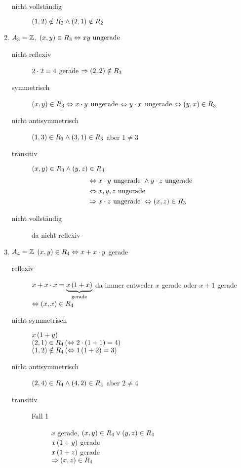 \begin{enumerate}[label=\alph*)]
\begin{description}
	\item[nicht vollständig] $\left(1, 2\right) \notin R_2 \wedge \left(2, 1\right) \notin R_2$
	\end{description}

\item $A_3 = \mathbb{Z}$, $\left(x, y\right) \in R_3 \Leftrightarrow xy \text{ ungerade}$
	\begin{description}
	\item[nicht reflexiv] $2 \cdot 2 = 4$ gerade $\Rightarrow \left(2,2\right) \notin R_3$
	\item[symmetrisch] $\left(x, y\right) \in R_3 \Leftrightarrow x \cdot y$ ungerade $\Leftrightarrow y \cdot x$ ungerade $\Leftrightarrow \left(y, x\right) \in R_3$
	\item[nicht antisymmetrisch] $\left(1, 3\right) \in R_3 \wedge \left(3, 1\right) \in R_3$ aber $1 \neq 3$
	\item[transitiv] $\left(x, y\right) \in R_3 \wedge \left(y, z\right) \in R_3$
		\begin{align*}
		&\Leftrightarrow x \cdot y \text{ ungerade } \wedge y \cdot z \text{ ungerade}\\
		&\Leftrightarrow x, y, z \text{ ungerade}\\
		&\Rightarrow x \cdot z \text{ ungerade } \Leftrightarrow \left(x, z\right) \in R_3
		\end{align*}

	\item[nicht vollständig] da nicht reflexiv
	\end{description}

\item $A_4 = \mathbb{Z}$ $\left(x, y\right) \in R_4 \Leftrightarrow x + x \cdot y$ gerade
	\begin{description}
	\item[reflexiv] $x + x \cdot x = \underbrace{x \left(1 + x\right)}_{\text{gerade}}$ da immer entweder $x$ gerade oder $x + 1$ gerade $\Leftrightarrow \left(x, x\right) \in R_4$
	\item[nicht symmetrisch] $x \left(1 + y\right)$\\
		$\left(2, 1\right) \in R_4 \left(\Leftrightarrow 2 \cdot \left(1 + 1\right) = 4\right)$\\
		$\left(1, 2\right) \notin R_4 \left(\Leftrightarrow 1 \left(1 + 2\right) = 3\right)$

	\item[nicht antisymmetrisch] $\left(2, 4\right) \in R_4 \wedge \left(4, 2\right) \in R_4$ aber $2 \neq 4$
	\item[transitiv]
		\begin{description}
		\item[Fall 1] $x$ gerade, $\left(x, y\right) \in R_4 \vee \left(y, z\right) \in R_4$\\
			$x \left(1 + y\right)$ gerade\\
			$x \left(1 + z\right)$ gerade\\
			$\Rightarrow \left(x, z\right) \in R_4$


\end{description}
\end{description}
\end{enumerate}
